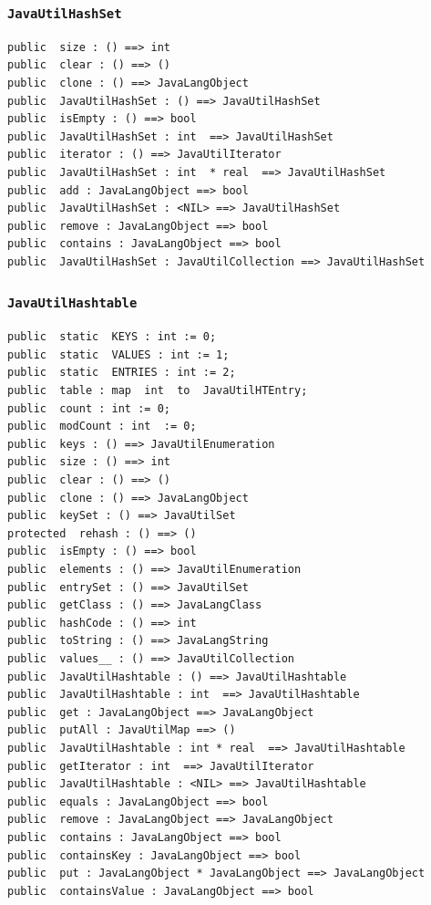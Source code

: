 \documentclass[\pformat,12pt]{article}
\begin{document}
\subsubsection{\texttt{JavaUtilHashSet}}
\begin{small}
\begin{verbatim}
public  size : () ==> int
public  clear : () ==> ()
public  clone : () ==> JavaLangObject
public  JavaUtilHashSet : () ==> JavaUtilHashSet
public  isEmpty : () ==> bool
public  JavaUtilHashSet : int  ==> JavaUtilHashSet
public  iterator : () ==> JavaUtilIterator
public  JavaUtilHashSet : int  * real  ==> JavaUtilHashSet
public  add : JavaLangObject ==> bool
public  JavaUtilHashSet : <NIL> ==> JavaUtilHashSet
public  remove : JavaLangObject ==> bool
public  contains : JavaLangObject ==> bool
public  JavaUtilHashSet : JavaUtilCollection ==> JavaUtilHashSet
\end{verbatim}
\end{small}

\subsubsection{\texttt{JavaUtilHashtable}}
\begin{small}
\begin{verbatim}
public  static  KEYS : int := 0;
public  static  VALUES : int := 1;
public  static  ENTRIES : int := 2;
public  table : map  int  to  JavaUtilHTEntry;
public  count : int := 0;
public  modCount : int  := 0;
public  keys : () ==> JavaUtilEnumeration
public  size : () ==> int
public  clear : () ==> ()
public  clone : () ==> JavaLangObject
public  keySet : () ==> JavaUtilSet
protected  rehash : () ==> ()
public  isEmpty : () ==> bool
public  elements : () ==> JavaUtilEnumeration
public  entrySet : () ==> JavaUtilSet
public  getClass : () ==> JavaLangClass
public  hashCode : () ==> int
public  toString : () ==> JavaLangString
public  values__ : () ==> JavaUtilCollection
public  JavaUtilHashtable : () ==> JavaUtilHashtable
public  JavaUtilHashtable : int  ==> JavaUtilHashtable
public  get : JavaLangObject ==> JavaLangObject
public  putAll : JavaUtilMap ==> ()
public  JavaUtilHashtable : int * real  ==> JavaUtilHashtable
public  getIterator : int  ==> JavaUtilIterator
public  JavaUtilHashtable : <NIL> ==> JavaUtilHashtable
public  equals : JavaLangObject ==> bool
public  remove : JavaLangObject ==> JavaLangObject
public  contains : JavaLangObject ==> bool
public  containsKey : JavaLangObject ==> bool
public  put : JavaLangObject * JavaLangObject ==> JavaLangObject
public  containsValue : JavaLangObject ==> bool
\end{verbatim}
\end{small}
\end{document}
